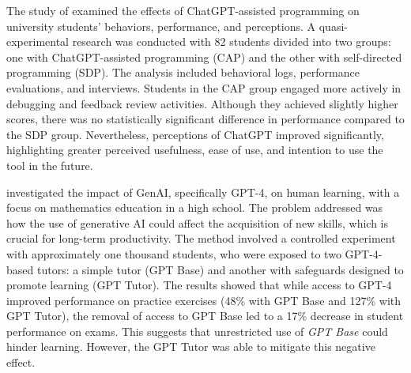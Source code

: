 \documentclass[a4paper,twoside]{article}
\begin{document}

The study of \cite{Boudouaia24} examined the effects of ChatGPT-assisted
programming on university students' behaviors, performance, and perceptions.
A quasi-experimental research was conducted with 82 students divided into two
groups: one with ChatGPT-assisted programming (CAP) and the other with
self-directed programming (SDP). The analysis included behavioral logs,
performance evaluations, and interviews. Students in the CAP group engaged more
actively in debugging and feedback review activities. Although they achieved
slightly higher scores, there was no statistically significant difference in
performance compared to the SDP group. Nevertheless, perceptions of ChatGPT
improved significantly, highlighting greater perceived usefulness, ease of use,
and intention to use the tool in the future.

\cite{Bastani24} investigated the impact of GenAI, specifically GPT-4, on human
learning, with a focus on mathematics education in a high school. The problem
addressed was how the use of generative AI could affect the acquisition of new
skills, which is crucial for long-term productivity. The method involved a
controlled experiment with approximately one thousand students, who were exposed
to two GPT-4-based tutors: a simple tutor (GPT Base) and another with safeguards
designed to promote learning (GPT Tutor). The results showed that while access
to GPT-4 improved performance on practice exercises (48\% with GPT Base and
127\% with GPT Tutor), the removal of access to GPT Base led to a 17\% decrease
in student performance on exams. This suggests that unrestricted use of
\textit{GPT Base} could hinder learning. However, the GPT Tutor was able to
mitigate this negative effect.
\end{document}

